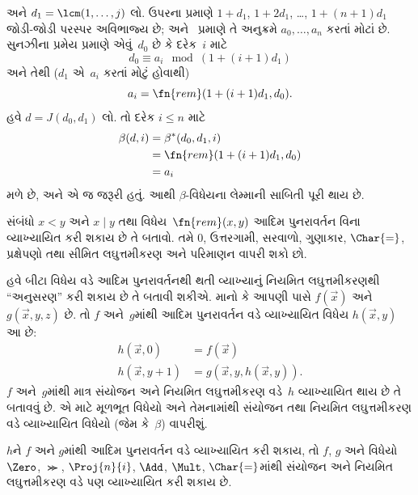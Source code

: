 અને $d_1 = \lcm(1,\dots,j)$ લો.
ઉપરના  પ્રમાણે
$1+d_1$, $1+2 d_1$, \dots,
$1+(n+1) d_1$ જોડી-જોડી
પરસ્પર અવિભાજ્ય છે; અને~
પ્રમાણે તે અનુક્રમે
$a_0,\dots,a_n$ કરતાં મોટાં છે.
સુનઝીના પ્રમેય પ્રમાણે એવું~$d_0$
છે કે દરેક~$i$ માટે
\[
d_0 \equiv a_i \mod (1+(i+1)d_1)
\]
અને તેથી ($d_1$ એ~$a_i$
કરતાં મોટું હોવાથી)
\[
a_i = \fn{rem}(1+(i+1)d_1,d_0).
\]
હવે $d = J(d_0,d_1)$ લો.
તો દરેક $i \le n$ માટે
\begin{align*}
\beta(d,i) & =  \beta^*(d_0,d_1,i) \\
& =  \fn{rem}(1+(i+1) d_1,d_0) \\
& =  a_i
\end{align*}
મળે છે, અને એ જ જરૂરી હતું.
આથી $\beta$-વિધેયના લેમ્માની
સાબિતી પૂરી થાય છે.

\begin{prob}
  સંબંધો $x < y$ અને $x \mid y$
  તથા વિધેય~$\fn{rem}(x,y)$
  આદિમ પુનરાવર્તન વિના
  વ્યાખ્યાયિત કરી શકાય છે તે
  બતાવો. તમે $0$, ઉત્તરગામી,
  સરવાળો, ગુણાકાર, $\Char{=}$,
  પ્રક્ષેપણો તથા સીમિત
  લઘુત્તમીકરણ અને પરિમાણન
  વાપરી શકો છો.
\end{prob}
\endgroup


\begingroup
\makeatletter{}\makeatother

\label{guunit:OLP-0293}


હવે બીટા વિધેય વડે આદિમ
પુનરાવર્તનથી થતી વ્યાખ્યાનું
નિયમિત લઘુત્તમીકરણથી ``અનુસરણ''
કરી શકાય છે તે બતાવી શકીએ.
માનો કે આપણી પાસે $f(\vec x)$
અને $g(\vec x, y, z)$ છે.
તો $f$ અને~$g$માંથી આદિમ
પુનરાવર્તન વડે વ્યાખ્યાયિત વિધેય
$h(\vec x,y)$ આ છે:
\begin{align*}
h(\vec x, 0) & =  f(\vec x) \\
h(\vec x, y+1) & =  g(\vec x, y, h(\vec x, y)).
\end{align*}
$f$ અને~$g$માંથી માત્ર સંયોજન
અને નિયમિત લઘુત્તમીકરણ વડે~$h$
વ્યાખ્યાયિત થાય છે તે બતાવવું છે.
એ માટે મૂળભૂત વિધેયો અને
તેમનામાંથી સંયોજન તથા નિયમિત
લઘુત્તમીકરણ વડે વ્યાખ્યાયિત
વિધેયો (જેમ કે~$\beta$) વાપરીશું.

\begin{lem}
$h$ને $f$ અને $g$માંથી આદિમ
પુનરાવર્તન વડે વ્યાખ્યાયિત
કરી શકાય, તો $f$, $g$ અને
વિધેયો $\Zero$, $\Succ$,
$\Proj{n}{i}$, $\Add$, $\Mult$,
$\Char{=}$માંથી સંયોજન અને
નિયમિત લઘુત્તમીકરણ વડે પણ
વ્યાખ્યાયિત કરી શકાય છે.
\end{lem}

